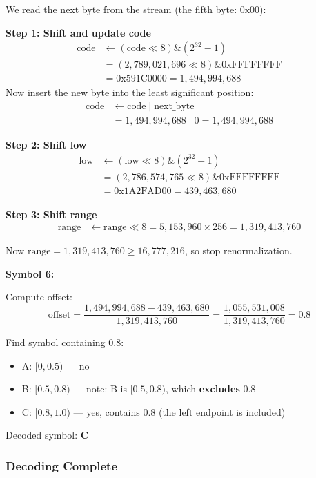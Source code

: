 \documentclass[12pt]{article}
\begin{document}
We read the next byte from the stream (the fifth byte: $\text{0x00}$):

\textbf{Step 1: Shift and update code}
\begin{align*}
\text{code} &\leftarrow (\text{code} \ll 8) \mathrel{\&} (2^{32}-1) \\
&= (2{,}789{,}021{,}696 \ll 8) \mathrel{\&} 0\text{xFFFFFFFF} \\
&= 0\text{x591C0000} = 1{,}494{,}994{,}688
\end{align*}
Now insert the new byte into the least significant position:
\begin{align*}
\text{code} &\leftarrow \text{code} \mid \text{next\_byte} \\
&= 1{,}494{,}994{,}688 \mid 0 = 1{,}494{,}994{,}688
\end{align*}

\textbf{Step 2: Shift low}
\begin{align*}
\text{low} &\leftarrow (\text{low} \ll 8) \mathrel{\&} (2^{32}-1) \\
&= (2{,}786{,}574{,}765 \ll 8) \mathrel{\&} 0\text{xFFFFFFFF} \\
&= 0\text{x1A2FAD00} = 439{,}463{,}680
\end{align*}

\textbf{Step 3: Shift range}
\begin{align*}
\text{range} &\leftarrow \text{range} \ll 8 = 5{,}153{,}960 \times 256 = 1{,}319{,}413{,}760
\end{align*}

Now $\text{range} = 1{,}319{,}413{,}760 \ge 16{,}777{,}216$, so stop renormalization.

\vspace{2mm}
\textbf{Symbol 6:}

Compute offset:
\[
\text{offset} = \frac{1{,}494{,}994{,}688 - 439{,}463{,}680}{1{,}319{,}413{,}760} = \frac{1{,}055{,}531{,}008}{1{,}319{,}413{,}760} = 0.8
\]

Find symbol containing 0.8:
\begin{itemize}
    \item A: $[0, 0.5)$ — no
    \item B: $[0.5, 0.8)$ — note: B is $[0.5, 0.8)$, which \textbf{excludes} 0.8
    \item C: $[0.8, 1.0)$ — yes, contains 0.8 (the left endpoint is included)
\end{itemize}

Decoded symbol: \textbf{C}

\subsubsection*{Decoding Complete}
\end{document}
